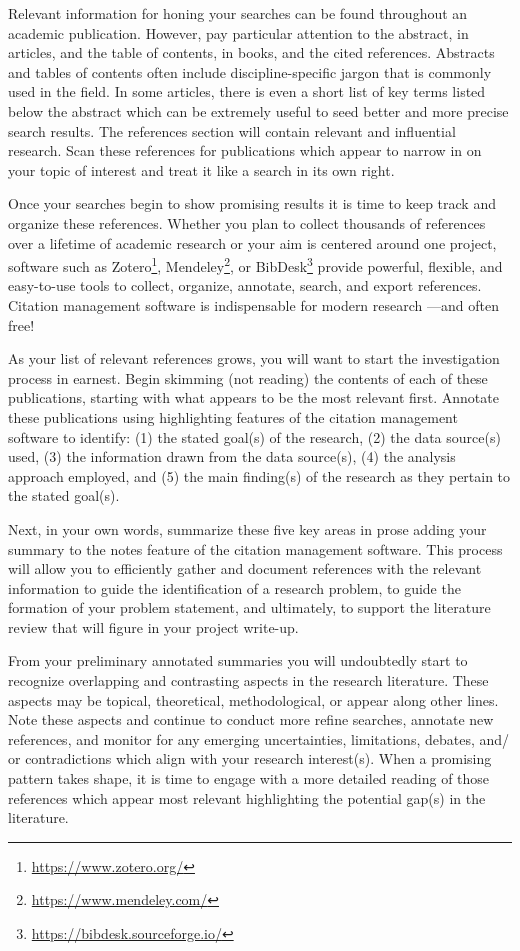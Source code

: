 \documentclass[
  letterpaper,
  krantz1]{latex/krantz-mod}
\theoremstyle{definition}
\theoremstyle{definition}
\theoremstyle{remark}
\DeclareRobustCommand{\href}[2]{#2\footnote{\url{#1}}}
\begin{document}
Relevant information for honing your searches can be found throughout an
academic publication. However, pay particular attention to the abstract,
in articles, and the table of contents, in books, and the cited
references. Abstracts and tables of contents often include
discipline-specific jargon that is commonly used in the field. In some
articles, there is even a short list of key terms listed below the
abstract which can be extremely useful to seed better and more precise
search results. The references section will contain relevant and
influential research. Scan these references for publications which
appear to narrow in on your topic of interest and treat it like a search
in its own right.

Once your searches begin to show promising results it is time to keep
track and organize these references. Whether you plan to collect
thousands of references over a lifetime of academic research or your aim
is centered around one project, software such as
\href{https://www.zotero.org/}{Zotero},
\href{https://www.mendeley.com/}{Mendeley}, or
\href{https://bibdesk.sourceforge.io/}{BibDesk} provide powerful,
flexible, and easy-to-use tools to collect, organize, annotate, search,
and export references. Citation management software is indispensable for
modern research ---and often free!

As your list of relevant references grows, you will want to start the
investigation process in earnest. Begin skimming (not reading) the
contents of each of these publications, starting with what appears to be
the most relevant first. Annotate these publications using highlighting
features of the citation management software to identify: (1) the stated
goal(s) of the research, (2) the data source(s) used, (3) the
information drawn from the data source(s), (4) the analysis approach
employed, and (5) the main finding(s) of the research as they pertain to
the stated goal(s).

Next, in your own words, summarize these five key areas in prose adding
your summary to the notes feature of the citation management software.
This process will allow you to efficiently gather and document
references with the relevant information to guide the identification of
a research problem, to guide the formation of your problem statement,
and ultimately, to support the literature review that will figure in
your project write-up.

From your preliminary annotated summaries you will undoubtedly start to
recognize overlapping and contrasting aspects in the research
literature. These aspects may be topical, theoretical, methodological,
or appear along other lines. Note these aspects and continue to conduct
more refine searches, annotate new references, and monitor for any
emerging uncertainties, limitations, debates, and/ or contradictions
which align with your research interest(s). When a promising pattern
takes shape, it is time to engage with a more detailed reading of those
references which appear most relevant highlighting the potential gap(s)
in the literature.
\end{document}

